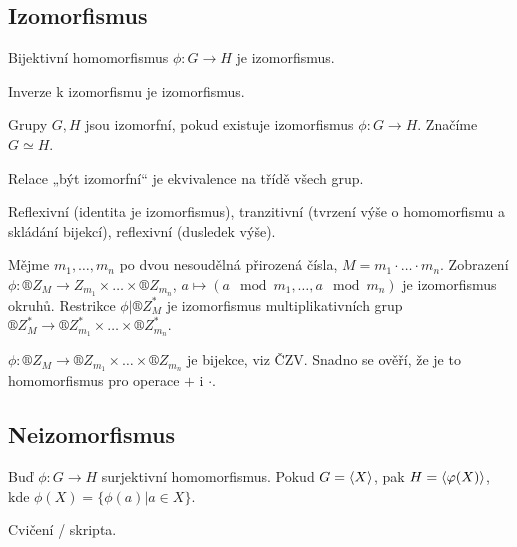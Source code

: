 \documentclass[12pt]{article}                   %
\begin{document}
    \subsection{Izomorfismus}
        \begin{definice}[Izomorfismus]
            Bijektivní homomorfismus $\phi: G \rightarrow H$ je izomorfismus.
        \end{definice}
        
        \begin{dusledek}
            Inverze k izomorfismu je izomorfismus.
        \end{dusledek}
        
        \begin{dukazin}
            Grupy $G, H$ jsou izomorfní, pokud existuje izomorfismus $\phi: G \rightarrow H$. Značíme $G \simeq H$.
        \end{dukazin}
        
        \begin{pozorovani}
            Relace „být izomorfní“ je ekvivalence na třídě všech grup.
            
            \begin{dukazin}
                Reflexivní (identita je izomorfismus), tranzitivní (tvrzení výše o homomorfismu a skládání bijekcí), reflexivní (dusledek výše).
            \end{dukazin}
        \end{pozorovani}
        
        \begin{tvrzeni}
            Mějme $m_1, …, m_n$ po dvou nesoudělná přirozená čísla, $M = m_1·…·m_n$. Zobrazení $\phi: ®Z_M \rightarrow Z_{m_1} \times … \times ®Z_{m_n}$, $a \mapsto (a \mod m_1, …, a \mod m_n)$ je izomorfismus okruhů. Restrikce $\phi|®Z_M^*$ je izomorfismus multiplikativních grup $®Z_M^* \rightarrow ®Z_{m_1}^* \times … \times ®Z_{m_n}^*$.
            
            \begin{dukazin}
                $\phi: ®Z_M \rightarrow ®Z_{m_1} \times … \times ®Z_{m_n}$ je bijekce, viz ČZV. Snadno se ověří, že je to homomorfismus pro operace $+$ i $·$.
            \end{dukazin}
        \end{tvrzeni}

    \subsection{Neizomorfismus}
        \begin{tvrzeni}
            Buď $\phi: G \rightarrow H$ surjektivní homomorfismus. Pokud $G = \left\langle X\right\rangle$, pak $H = \left\langle\varphi(X)\right\rangle$, kde $\phi(X) = \{\phi(a) | a \in X\}$.

            \begin{dukazin}
                Cvičení / skripta.
            \end{dukazin}
        \end{tvrzeni}
\end{document}
